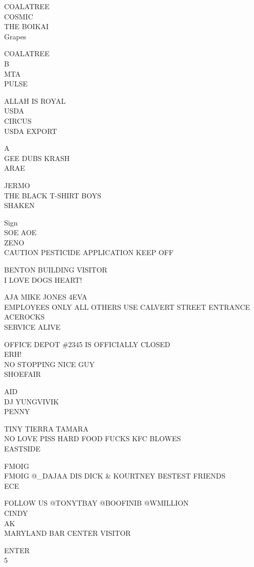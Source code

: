 \documentclass[10pt,letterpaper]{article}
\begin{document}
COALATREE\\
COSMIC\\
THE BOIKAI\\
Grapes

COALATREE\\
B\\
MTA\\
PULSE

ALLAH IS ROYAL\\
USDA\\
CIRCUS\\
USDA EXPORT

A\\
GEE DUBS KRASH\\
ARAE

JERMO\\
THE BLACK T{-}SHIRT BOYS\\
SHAKEN

Sign\\
SOE AOE\\
ZENO\\
CAUTION PESTICIDE APPLICATION KEEP OFF

BENTON BUILDING VISITOR\\
I LOVE DOGS HEART!

AJA MIKE JONES 4EVA\\
EMPLOYEES ONLY ALL OTHERS USE CALVERT STREET ENTRANCE\\
ACEROCKS\\
SERVICE ALIVE

OFFICE DEPOT \#2345 IS OFFICIALLY CLOSED\\
ERH!\\
NO STOPPING NICE GUY\\
SHOEFAIR

AID\\
DJ YUNGVIVIK\\
PENNY

TINY TIERRA TAMARA\\
NO LOVE PISS HARD FOOD FUCKS KFC BLOWES\\
EASTSIDE

FMOIG\\
FMOIG @\_DAJAA DIS DICK \& KOURTNEY BESTEST FRIENDS\\
ECE

FOLLOW US @TONYTBAY @BOOFINIB @WMILLION\\
CINDY\\
AK\\
MARYLAND BAR CENTER VISITOR

ENTER\\
5
\end{document}
